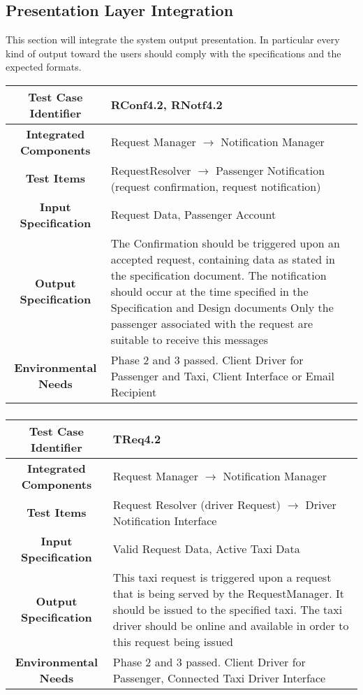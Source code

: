 \documentclass[11pt, a4paper,titlepage]{article}
\begin{document}
	\subsection{Presentation Layer Integration}
		This section will integrate the system output presentation. In particular every kind of output toward the users should comply with the specifications and the expected formats. \newline
			\begin{tabularx}{\textwidth}{| c|X|}
				\hline \textbf{Test Case Identifier} & \label{RConf4.2}RConf4.2, \label{RNotf4.2}RNotf4.2 \\
				\hline \textbf{Integrated Components} & Request Manager $\rightarrow $ Notification Manager \\
				\hline \textbf{Test Items} & RequestResolver $\rightarrow $ Passenger Notification (request confirmation, request notification) \\
				\hline \textbf{Input Specification} & Request Data, Passenger Account \\
				\hline \textbf{Output Specification} & The Confirmation should be triggered upon an accepted request, containing data as stated in the specification document. \newline
				The notification should occur at the time specified in the Specification and Design documents \newline
				Only the passenger associated with the request are suitable to receive this messages 
				\\
				\hline \textbf{Environmental Needs} & Phase 2 and 3 passed. Client Driver for Passenger and Taxi, Client Interface or Email Recipient \\
				\hline
			\end{tabularx}
			\newline
			\subsubsection{}
			\begin{tabularx}{\textwidth}{| c|X|}
				\hline \textbf{Test Case Identifier} & \label{TReq4.2}TReq4.2 \\
				\hline \textbf{Integrated Components} &  Request Manager $\rightarrow $ Notification Manager \\
				\hline \textbf{Test Items} & Request Resolver (driver Request) $\rightarrow $ Driver Notification Interface \\
				\hline \textbf{Input Specification} & Valid Request Data, Active Taxi Data \\
				\hline \textbf{Output Specification} & This taxi request is triggered upon a request that is being served by the RequestManager. It should be issued to the specified taxi. \newline
				The taxi driver should be online and available in order to this request being issued \\
				\hline \textbf{Environmental Needs} & Phase 2 and 3 passed. Client Driver for Passenger, Connected Taxi Driver Interface \\
				\hline
			\end{tabularx}
			\newline
\end{document}
